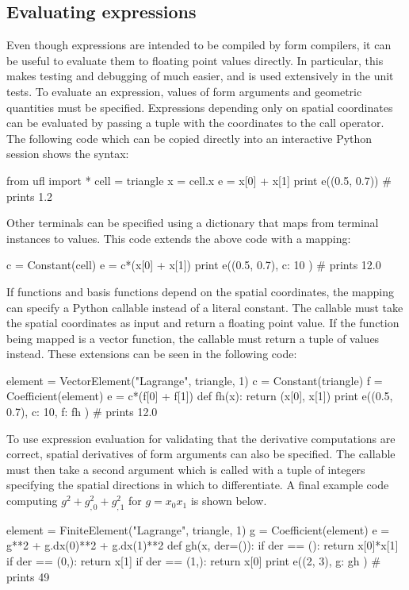 \subsection{Evaluating expressions}
\label{ufl:sec:evaluating}

Even though \ufl{} expressions are intended to be compiled by form
compilers, it can be useful to evaluate them to floating point values
directly. In particular, this makes testing and debugging of \ufl{}
much easier, and is used extensively in the unit tests.  To evaluate an
\ufl{} expression, values of form arguments and geometric quantities
must be specified.  Expressions depending only on spatial coordinates
can be evaluated by passing a tuple with the coordinates to the call
operator. The following code which can be copied directly into an
interactive Python session shows the syntax:
\begin{python}
from ufl import *
cell = triangle
x = cell.x
e = x[0] + x[1]
print e((0.5, 0.7)) # prints 1.2
\end{python}
Other terminals can be specified using a dictionary that maps from
terminal instances to values.  This code extends the above code with
a mapping:
\begin{python}
c = Constant(cell)
e = c*(x[0] + x[1])
print e((0.5, 0.7), { c: 10 }) # prints 12.0
\end{python}
If functions and basis functions depend on the spatial coordinates, the
mapping can specify a Python callable instead of a literal constant.
The callable must take the spatial coordinates as input and return a
floating point value.  If the function being mapped is a vector function,
the callable must return a tuple of values instead.  These extensions
can be seen in the following code:
\begin{python}
element = VectorElement("Lagrange", triangle, 1)
c = Constant(triangle)
f = Coefficient(element)
e = c*(f[0] + f[1])
def fh(x):
    return (x[0], x[1])
print e((0.5, 0.7), { c: 10, f: fh }) # prints 12.0
\end{python}
To use expression evaluation for validating that the derivative
computations are correct, spatial derivatives of form arguments can
also be specified.  The callable must then take a second argument which
is called with a tuple of integers specifying the spatial directions in
which to differentiate. A final example code computing $g^2 + g_{,0}^2 +
g_{,1}^2$ for $g=x_0x_1$ is shown below.
\begin{python}
element = FiniteElement("Lagrange", triangle, 1)
g = Coefficient(element)
e = g**2 + g.dx(0)**2 + g.dx(1)**2
def gh(x, der=()):
    if der == ():   return x[0]*x[1]
    if der == (0,): return x[1]
    if der == (1,): return x[0]
print e((2, 3), { g: gh }) # prints 49
\end{python}

